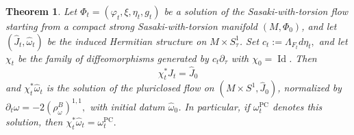 \documentclass[10pt,a4paper]{amsart}
\newtheorem{thm}{Theorem}
\begin{document}
\begin{thm}
\label{thm:SWT-pluriclosed}
Let $\Phi_t=(\varphi_t,\xi,\eta_t,g_t)$ be a solution of the
Sasaki-with-torsion flow starting from a compact strong
Sasaki-with-torsion manifold $(M, \Phi_0)$, and let
$(\widehat J_t,\widehat\omega_t)$ be the induced Hermitian structure
on $M\times S^1_{\tau}$. Set $
c_t:=\Lambda_{F_t}d\eta_t,$ 
and let $\chi_t$ be the family of diffeomorphisms generated by
$c_t\partial_\tau$ with $\chi_0=\operatorname{Id}$. Then
\[
\chi_t^*\widehat J_t=\widehat J_0
\]
and $\chi_t^*\widehat\omega_t$ is the solution of the pluriclosed flow
on $(M\times S^1,\widehat J_0)$, normalized by
$
\partial_t\omega
=
-2\left(\rho^B_\omega\right)^{1,1},
$
with initial datum $\widehat\omega_0$. In particular, if
$\omega_t^{\mathrm{PC}}$ denotes this solution, then
$
\chi_t^*\widehat\omega_t=\omega_t^{\mathrm{PC}}.
$
\end{thm}
\end{document}
